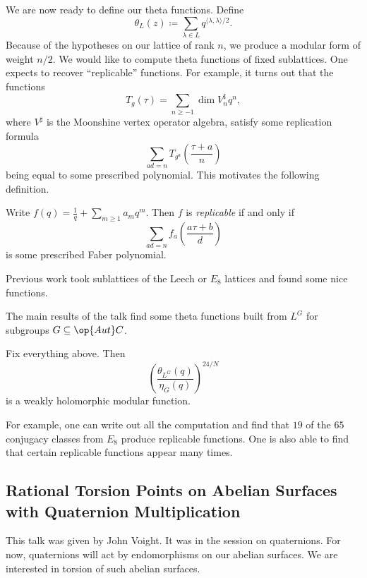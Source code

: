 \documentclass{article}
\begin{document}
We are now ready to define our theta functions. Define
\[\theta_L(z)\coloneqq\sum_{\lambda\in L}q^{\langle\lambda,\lambda\rangle/2}.\]
Because of the hypotheses on our lattice of rank $n$, we produce a modular form of weight $n/2$. We would like to compute theta functions of fixed sublattices. One expects to recover ``replicable'' functions. For example, it turns out that the functions
\[T_g(\tau)=\sum_{n\ge-1}\dim V_n^\sharp q^n,\]
where $V^\sharp$ is the Moonshine vertex operator algebra, satisfy some replication formula
\[\sum_{ad=n}T_{g^a}\left(\frac{\tau+a}n\right)\]
being equal to some prescribed polynomial. This motivates the following definition.
\begin{definition}
	Write $f(q)=\frac1q+\sum_{m\ge1}a_mq^m$. Then $f$ is \textit{replicable} if and only if
	\[\sum_{ad=n}f_a\left(\frac{a\tau+b}d\right)\]
	is some prescribed Faber polynomial.
\end{definition}
Previous work took sublattices of the Leech or $E_8$ lattices and found some nice functions.

The main results of the talk find some theta functions built from $L^G$ for subgroups $G\subseteq\op{Aut}C$.
\begin{theorem}
	Fix everything above. Then
	\[\left(\frac{\theta_{L^G}(q)}{\eta_G(q)}\right)^{24/N}\]
	is a weakly holomorphic modular function.
\end{theorem}
For example, one can write out all the computation and find that $19$ of the $65$ conjugacy classes from $E_8$ produce replicable functions. One is also able to find that certain replicable functions appear many times.

\subsection{Rational Torsion Points on Abelian Surfaces with Quaternion Multiplication}
This talk was given by John Voight. It was in the session on quaternions. For now, quaternions will act by endomorphisms on our abelian surfaces. We are interested in torsion of such abelian surfaces.
\end{document}

